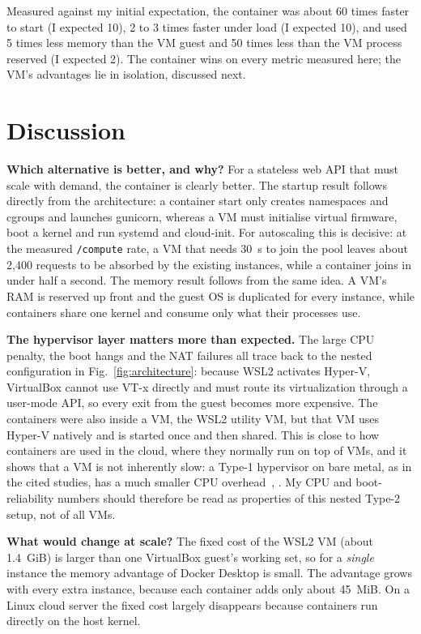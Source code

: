 \documentclass[conference,a4paper]{IEEEtran}
\begin{document}
Measured against my initial expectation, the container was about 60 times faster to start (I expected 10), 2 to 3 times faster under load (I expected 10), and used 5 times less memory than the VM guest and 50 times less than the VM process reserved (I expected 2). The container wins on every metric measured here; the VM's advantages lie in isolation, discussed next.

\section{Discussion}
\label{sec:discussion}

\textbf{Which alternative is better, and why?} For a stateless web API that must scale with demand, the container is clearly better. The startup result follows directly from the architecture: a container start only creates namespaces and cgroups and launches gunicorn, whereas a VM must initialise virtual firmware, boot a kernel and run systemd and cloud-init. For autoscaling this is decisive: at the measured \texttt{/compute} rate, a VM that needs 30~s to join the pool leaves about 2{,}400 requests to be absorbed by the existing instances, while a container joins in under half a second. The memory result follows from the same idea. A VM's RAM is reserved up front and the guest OS is duplicated for every instance, while containers share one kernel and consume only what their processes use.

\textbf{The hypervisor layer matters more than expected.} The large CPU penalty, the boot hangs and the NAT failures all trace back to the nested configuration in Fig.~\ref{fig:architecture}: because WSL2 activates Hyper-V, VirtualBox cannot use VT-x directly and must route its virtualization through a user-mode API, so every exit from the guest becomes more expensive. The containers were also inside a VM, the WSL2 utility VM, but that VM uses Hyper-V natively and is started once and then shared. This is close to how containers are used in the cloud, where they normally run on top of VMs, and it shows that a VM is not inherently slow: a Type-1 hypervisor on bare metal, as in the cited studies, has a much smaller CPU overhead~\cite{felter}, \cite{morabito}. My CPU and boot-reliability numbers should therefore be read as properties of this nested Type-2 setup, not of all VMs.

\textbf{What would change at scale?} The fixed cost of the WSL2 VM (about 1.4~GiB) is larger than one VirtualBox guest's working set, so for a \emph{single} instance the memory advantage of Docker Desktop is small. The advantage grows with every extra instance, because each container adds only about 45~MiB. On a Linux cloud server the fixed cost largely disappears because containers run directly on the host kernel.
\end{document}
